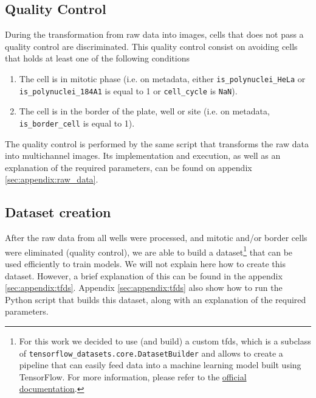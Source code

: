 \subsection{Quality Control}

During the transformation from raw data into images, cells that does not pass a quality control are discriminated. This quality control consist on avoiding cells that holds at least one of the following conditions
\begin{enumerate}
  \item The cell is in mitotic phase (i.e. on metadata, either \texttt{is\_polynuclei\_HeLa} or \texttt{is\_polynuclei\_184A1} is equal to 1 or \texttt{cell\_cycle} is \texttt{NaN}).
  \item The cell is in the border of the plate, well or site (i.e. on metadata, \texttt{is\_border\_cell} is equal to 1).
\end{enumerate}

The quality control is performed by the same script that transforms the raw data into multichannel images. Its implementation and execution, as well as an explanation of the required parameters, can be found on appendix \ref{sec:appendix:raw_data}.

\subsection{Dataset creation}
\label{sec:dataset:data_pp:dataset_creation}

After the raw data from all wells were processed, and mitotic and/or border cells were eliminated (quality control), we are able to build a dataset\footnote{For this work we decided to use (and build) a custom \acrfull{tfds}, which is a subclass of \texttt{tensorflow\_datasets.core.DatasetBuilder} and allows to create a pipeline that can easily feed data into a machine learning model built using TensorFlow. For more information, please refer to the \href{https://www.tensorflow.org/datasets/add_dataset}{official documentation}.} that can be used efficiently to train models. We will not explain here how to create this dataset. However, a brief explanation of this can be found in the appendix \ref{sec:appendix:tfds}. Appendix \ref{sec:appendix:tfds} also show how to run the Python script that builds this dataset, along with an explanation of the required parameters.

